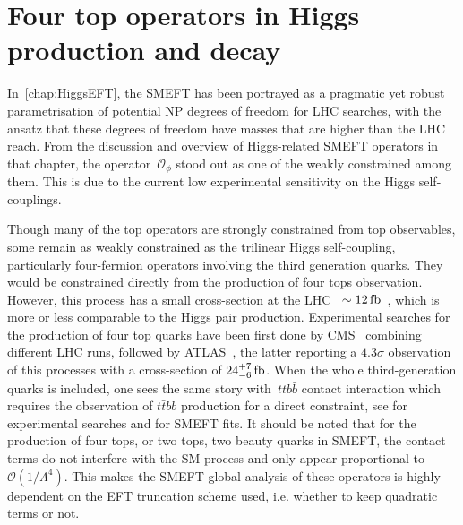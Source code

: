 

\chapter{ Four top operators in Higgs production and decay}\label{chap:4topSingleHiggs}
%
\par In~\autoref{chap:HiggsEFT}, the SMEFT has been portrayed as a pragmatic yet robust parametrisation of potential NP degrees of freedom for LHC searches, with the ansatz that these degrees of freedom have masses that are higher than the LHC reach. From the discussion and overview of Higgs-related SMEFT operators in that chapter, the operator~$ \mathcal O _{\phi}$ stood out as one of the weakly constrained among them. This is due to the current low experimental sensitivity on the Higgs self-couplings.
\par 
Though many of the top operators are strongly constrained from top observables, some remain as weakly constrained as the trilinear Higgs self-coupling, particularly four-fermion operators involving the third generation quarks. They would be constrained directly from the production of four tops observation. However, this process has a small cross-section at the LHC~ $\sim12\, \femtobarn$~\cite{Frederix:2017wme}, which is more or less comparable to the Higgs pair production. Experimental searches for the production of four top quarks have been first done by CMS~\cite{Sirunyan:2019nxl} combining different LHC runs, followed by ATLAS~\cite{Aad:2020klt}, the latter reporting a $4.3 \sigma$ observation of this processes with a cross-section of $24^{+7}_{-6}\,\femtobarn$. When the whole third-generation quarks is included, one sees the same story with~$t\bar{t}b\bar{b}$ contact interaction which requires the observation of $t\bar{t}b\bar{b}$ production for a direct constraint, see \cite{Sirunyan:2020kgar, ATLAS:2018gug} for experimental searches and \cite{DHondt:2018cww, Hartland:2019bjb} for SMEFT fits. It should be noted that for the production of four tops, or two tops, two beauty quarks in SMEFT, the contact terms do not interfere with the SM process and only appear proportional to $\mathcal{O}(1/\Lambda^4)$. This makes the SMEFT global analysis of these operators is highly dependent on the EFT truncation scheme used, i.e. whether to keep quadratic terms or not. 
